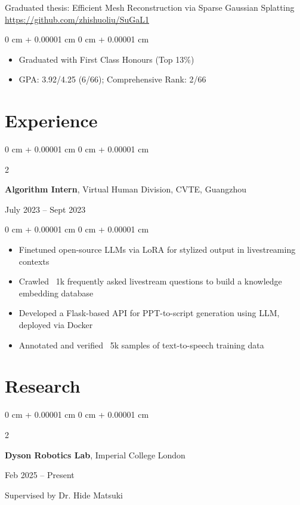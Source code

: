 \documentclass[10pt, letterpaper]{article}
\newenvironment{highlights}{
    \begin{itemize}[
        topsep=0.10 cm,
        parsep=0.10 cm,
        partopsep=0pt,
        itemsep=0pt,
        leftmargin=0 cm + 10pt
    ]
}{
    \end{itemize}
} %
\newenvironment{onecolentry}{
    \begin{adjustwidth}{
        0 cm + 0.00001 cm
    }{
        0 cm + 0.00001 cm
    }
}{
    \end{adjustwidth}
} %
\newenvironment{twocolentry}[2][]{
    \onecolentry
    \def\secondColumn{#2}
    \setcolumnwidth{\fill, 4.5 cm}
    \begin{paracol}{2}
}{
    \switchcolumn \raggedleft \secondColumn
    \end{paracol}
    \endonecolentry
} %
\begin{document}
    Graduated thesis: Efficient Mesh Reconstruction via Sparse Gaussian Splatting \href{https://github.com/zhishuoliu/SuGaL1}{https://github.com/zhishuoliu/SuGaL1}

    \vspace{0.10 cm}
    \begin{onecolentry}
        \begin{highlights}
            \item Graduated with First Class Honours (Top 13\%)
            \item GPA: 3.92/4.25 (6/66); Comprehensive Rank: 2/66
        \end{highlights}
    \end{onecolentry}

\section{Experience}

    \begin{twocolentry}{
        July 2023 -- Sept 2023
    }
        \textbf{Algorithm Intern}, Virtual Human Division, CVTE, Guangzhou
    \end{twocolentry}

    \vspace{0.10 cm}
    \begin{onecolentry}
        \begin{highlights}
            \item Finetuned open-source LLMs via LoRA for stylized output in livestreaming contexts
            \item Crawled ~1k frequently asked livestream questions to build a knowledge embedding database
            \item Developed a Flask-based API for PPT-to-script generation using LLM, deployed via Docker
            \item Annotated and verified ~5k samples of text-to-speech training data
        \end{highlights}
    \end{onecolentry}

\section{Research}

    \begin{twocolentry}{
        Feb 2025 -- Present
    }
        \textbf{Dyson Robotics Lab}, Imperial College London
    \end{twocolentry}
    Supervised by Dr. Hide Matsuki
\end{document}
